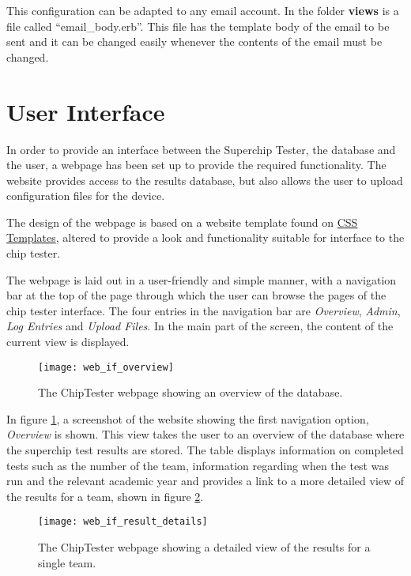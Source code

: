 This configuration can be adapted to any email account. In the folder {\bf views} is a file called ``email\_body.erb''. This file has the template body of the email to be sent and it can be changed easily whenever the contents of the email must be changed.


\newpage
\section{User Interface}

In order to provide an interface between the Superchip Tester, the database and the user, a webpage has been set up to provide the required functionality. The website provides access to the results database, but also allows the user to upload configuration files for the device.

The design of the webpage is based on a website template found on \href{http://www.freecsstemplates.org/}{CSS Templates}, altered to provide a look and functionality suitable for interface to the chip tester.

The webpage is laid out in a user-friendly and simple manner, with a navigation bar at the top of the page through which the user can browse the pages of the chip tester interface. The four entries in the navigation bar are \textit{Overview}, \textit{Admin}, \textit{Log Entries} and \textit{Upload Files}. In the main part of the screen, the content of the current view is displayed.

\begin{figure}[ht]
 \centering
 \texttt{[image: web\_if\_overview]}
 \caption{The ChipTester webpage showing an overview of the database.}
 \label{fig:web_if_overview}
\end{figure}

In figure \ref{fig:web_if_overview}, a screenshot of the website showing the first navigation option, \textit{Overview} is shown. This view takes the user to an overview of the database where the superchip test results are stored. The table displays information on completed tests such as the number of the team, information regarding when the test was run and the relevant academic year and provides a link to a more detailed view of the results for a team, shown in figure \ref{fig:web_if_result_details}.

\begin{figure}[ht]
 \centering
 \texttt{[image: web\_if\_result\_details]}
 \caption{The ChipTester webpage showing a detailed view of the results for a single team.}
 \label{fig:web_if_result_details}
\end{figure}

